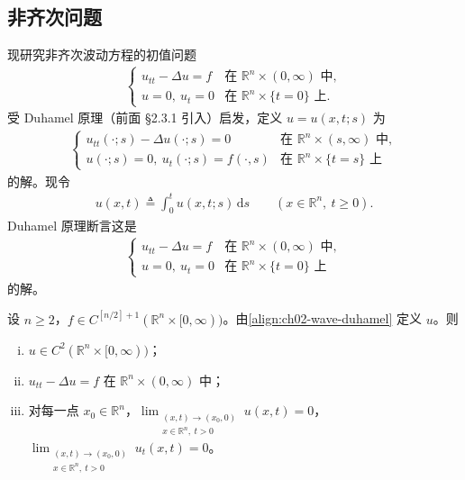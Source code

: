 \documentclass[../../main.tex]{subfiles}
\begin{document}
\subsection{非齐次问题}\label{subsection:ch02-wave-nonhom}

现研究非齐次波动方程的初值问题
\begin{align}\label{align:ch02-wave-nonhom-ivp}
\begin{cases}
u_{tt}-\Delta u=f & \text{在 }\mathbb{R}^n\times(0,\infty)\text{ 中},\\
u=0,\ u_t=0 & \text{在 }\mathbb{R}^n\times\{t=0\}\text{ 上}.
\end{cases}
\end{align}
受 Duhamel 原理（前面 \S2.3.1 引入）启发，定义 $u=u(x,t;s)$ 为
\begin{align}\label{align:ch02-wave-nonhom-ivps}
\begin{cases}
u_{tt}(\cdot;s)-\Delta u(\cdot;s)=0 & \text{在 }\mathbb{R}^n\times(s,\infty)\text{ 中},\\
u(\cdot;s)=0,\ u_t(\cdot;s)=f(\cdot,s) & \text{在 }\mathbb{R}^n\times\{t=s\}\text{ 上}
\end{cases}
\end{align}
的解。现令
\begin{align}\label{align:ch02-wave-duhamel}
u(x,t)\triangleq\int_0^t u(x,t;s)\,\mathrm{d}s \qquad (x\in\mathbb{R}^n,\ t\geqslant 0).
\end{align}
Duhamel 原理断言这是
\begin{align}\label{align:ch02-wave-nonhom-final}
\begin{cases}
u_{tt}-\Delta u=f & \text{在 }\mathbb{R}^n\times(0,\infty)\text{ 中},\\
u=0,\ u_t=0 & \text{在 }\mathbb{R}^n\times\{t=0\}\text{ 上}
\end{cases}
\end{align}
的解。

\begin{theorem}[非齐次波动方程的解]\label{theorem:ch02-wave-nonhom}设 $n\geqslant 2$，$f\in C^{[n/2]+1}(\mathbb{R}^n\times[0,\infty))$。由\eqref{align:ch02-wave-duhamel} 定义 $u$。则
\begin{enumerate}[(i)]
\item $u\in C^2(\mathbb{R}^n\times[0,\infty))$；
\item $u_{tt}-\Delta u=f$ 在 $\mathbb{R}^n\times(0,\infty)$ 中；
\item 对每一点 $x_0\in\mathbb{R}^n$，$\displaystyle\lim_{\substack{(x,t)\to(x_0,0)\\x\in\mathbb{R}^n,\ t>0}}u(x,t)=0$，$\displaystyle\lim_{\substack{(x,t)\to(x_0,0)\\x\in\mathbb{R}^n,\ t>0}}u_t(x,t)=0$。
\end{enumerate}
\end{theorem}
\end{document}
